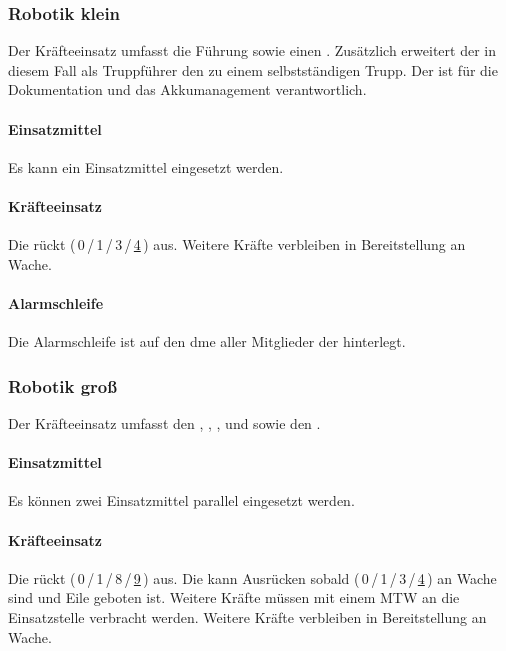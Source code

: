 \subsubsection{Robotik klein}
\label{sec:alarmSmall}

\noindent Der Kräfteeinsatz umfasst die Führung sowie einen \robotiktrupp{}. Zusätzlich erweitert der \melder{} in diesem Fall als Truppführer den \robotiktrupp{} zu einem selbstständigen Trupp. Der \melder{} ist für die Dokumentation und das Akkumanagement verantwortlich.

\paragraph{Einsatzmittel} Es kann ein Einsatzmittel eingesetzt werden.

\paragraph{Kräfteeinsatz} Die \callee{} rückt (\,0\,/\,1\,/\,3\,/\,\underline{4}\,) aus. Weitere Kräfte verbleiben in Bereitstellung an Wache.

\paragraph{Alarmschleife} Die Alarmschleife ist auf den \ac{dme} aller Mitglieder der \callee{} hinterlegt.

\subsubsection{Robotik groß}

Der Kräfteeinsatz umfasst den \gruppenfuehrer{}, \melder{}, \maschinist{}, \angriffstrupp{} und \wassertrupp{} sowie den \schlauchtrupp{}.

\paragraph{Einsatzmittel} Es können zwei Einsatzmittel parallel eingesetzt werden.

\paragraph{Kräfteeinsatz} Die \callee{} rückt (\,0\,/\,1\,/\,8\,/\,\underline{9}\,) aus. Die \callee{} kann Ausrücken sobald (\,0\,/\,1\,/\,3\,/\,\underline{4}\,) an Wache sind und Eile geboten ist. Weitere Kräfte müssen mit einem MTW an die Einsatzstelle verbracht werden. Weitere Kräfte verbleiben in Bereitstellung an Wache.


